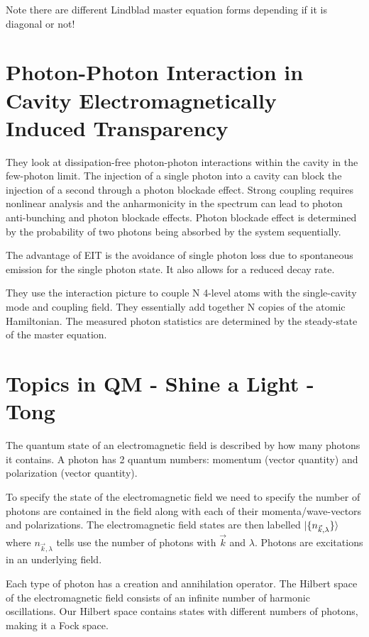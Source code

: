 \documentclass[aps,pra,twocolumn,showpacs,amsmath,amssymb,nofootinbib,longbibliography,superscriptaddress
]{revtex4-1}
\DeclarePairedDelimiter\ket{\lvert}{\rangle}
\theoremstyle{definition}
\theoremstyle{remark}
\newcommand{\0}{\hat{0}}
\begin{document}
Note there are different Lindblad master equation forms depending if it is diagonal or not!



\section{Photon-Photon Interaction in Cavity Electromagnetically Induced Transparency}

They look at dissipation-free photon-photon interactions within the cavity in the few-photon limit. The injection of a single photon into a cavity can block the injection of a second through a photon blockade effect. Strong coupling requires nonlinear analysis and the anharmonicity in the spectrum can lead to photon anti-bunching and photon blockade effects. Photon blockade effect is determined by the probability of two photons being absorbed by the system sequentially.

The advantage of EIT is the avoidance of single photon loss due to spontaneous emission for the single photon state. It also allows for a reduced decay rate.

They use the interaction picture to couple N 4-level atoms with the single-cavity mode and coupling field. They essentially add together N copies of the atomic Hamiltonian. The measured photon statistics are determined by the steady-state of the master equation.


\section{Topics in QM - Shine a Light - Tong}

The quantum state of an electromagnetic field is described by how many photons it contains. A photon has 2 quantum numbers: momentum (vector quantity) and polarization (vector quantity).

To specify the state of the electromagnetic field we need to specify the number of photons are contained in the field along with each of their momenta/wave-vectors and polarizations. The electromagnetic field states are then labelled $\ket{ \{ n_{\vec{k}, \lambda} \} }$ where $n_{\vec{k}, \lambda}$ tells use the number of photons with $\vec{k}$ and $\lambda$. Photons are excitations in an underlying field. 

Each type of photon has a creation and annihilation operator. The Hilbert space of the electromagnetic field consists of an infinite number of harmonic oscillations. Our Hilbert space contains states with different numbers of photons, making it a Fock space.
\end{document}
